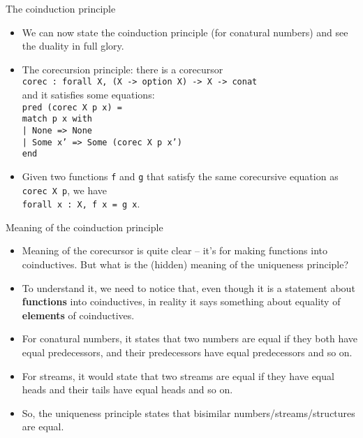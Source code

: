 \documentclass{beamer}
\begin{document}
\begin{frame}{The coinduction principle}
\begin{itemize}
	\item We can now state the coinduction principle (for conatural numbers) and see the duality in full glory.
	\item The corecursion principle: there is a corecursor \\
	\texttt{corec :\ forall X, (X -> option X) -> X -> conat} \\
	and it satisfies some equations: \\
	\texttt{pred (corec X p x) =\\
	match p x with \\
	| None => None \\
	| Some x' => Some (corec X p x') \\
	end}
	\item Given two functions \texttt{f} and \texttt{g} that satisfy the same corecursive equation as \texttt{corec X p}, we have \\
	\texttt{forall x :\ X, f x = g x}.
\end{itemize}
\end{frame}

\begin{frame}{Meaning of the coinduction principle}
\begin{itemize}
	\item Meaning of the corecursor is quite clear -- it's for making functions into coinductives. But what is the (hidden) meaning of the uniqueness principle?
	\item To understand it, we need to notice that, even though it is a statement about \textbf{functions} into coinductives, in reality it says something about equality of \textbf{elements} of coinductives.
	\item For conatural numbers, it states that two numbers are equal if they both have equal predecessors, and their predecessors have equal predecessors and so on.
	\item For streams, it would state that two streams are equal if they have equal heads and their tails have equal heads and so on.
	\item So, the uniqueness principle states that bisimilar numbers/streams/structures are equal.
\end{itemize}
\end{frame}
\end{document}
